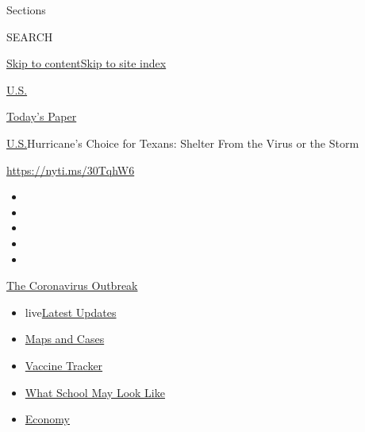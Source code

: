 Sections

SEARCH

\protect\hyperlink{site-content}{Skip to
content}\protect\hyperlink{site-index}{Skip to site index}

\href{https://www.nytimes.com/section/us}{U.S.}

\href{https://myaccount.nytimes.com/auth/login?response_type=cookie\&client_id=vi}{}

\href{https://www.nytimes.com/section/todayspaper}{Today's Paper}

\href{/section/us}{U.S.}\textbar{}Hurricane's Choice for Texans: Shelter
From the Virus or the Storm

\url{https://nyti.ms/30TqhW6}

\begin{itemize}
\item
\item
\item
\item
\item
\end{itemize}

\href{https://www.nytimes.com/news-event/coronavirus?action=click\&pgtype=Article\&state=default\&region=TOP_BANNER\&context=storylines_menu}{The
Coronavirus Outbreak}

\begin{itemize}
\tightlist
\item
  live\href{https://www.nytimes.com/2020/08/01/world/coronavirus-covid-19.html?action=click\&pgtype=Article\&state=default\&region=TOP_BANNER\&context=storylines_menu}{Latest
  Updates}
\item
  \href{https://www.nytimes.com/interactive/2020/us/coronavirus-us-cases.html?action=click\&pgtype=Article\&state=default\&region=TOP_BANNER\&context=storylines_menu}{Maps
  and Cases}
\item
  \href{https://www.nytimes.com/interactive/2020/science/coronavirus-vaccine-tracker.html?action=click\&pgtype=Article\&state=default\&region=TOP_BANNER\&context=storylines_menu}{Vaccine
  Tracker}
\item
  \href{https://www.nytimes.com/interactive/2020/07/29/us/schools-reopening-coronavirus.html?action=click\&pgtype=Article\&state=default\&region=TOP_BANNER\&context=storylines_menu}{What
  School May Look Like}
\item
  \href{https://www.nytimes.com/live/2020/07/31/business/stock-market-today-coronavirus?action=click\&pgtype=Article\&state=default\&region=TOP_BANNER\&context=storylines_menu}{Economy}
\end{itemize}

